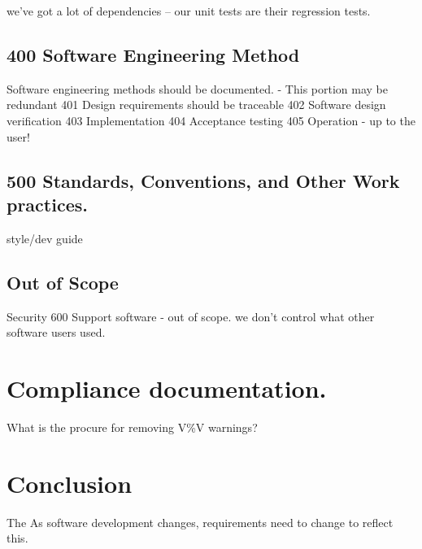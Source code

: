 \documentclass{anstrans}
\begin{document}
we've got a lot of dependencies -- our unit tests are their regression tests.

\subsection{400 Software Engineering Method}
Software engineering methods should be documented.
- This portion may be redundant
401 Design requirements should be traceable
402 Software design verification
403 Implementation
404 Acceptance testing
405 Operation - up to the user!

\subsection{500 Standards, Conventions, and Other Work practices.}

style/dev guide


\subsection{Out of Scope}
Security
600 Support software - out of scope. we don't control what other software users used. 


\section{Compliance documentation.}
What is the procure for removing V\%V warnings?


\section{Conclusion}

The 
As software development changes, requirements need to change to reflect this.



\end{document}
